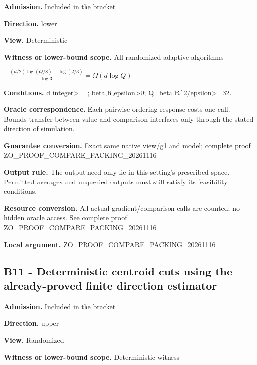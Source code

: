 \documentclass[10pt,a4paper]{article}
\newcommand{\AtlasMath}[1]{\par\begingroup\centering\setbox0=\hbox{$\displaystyle #1$}\ifdim\wd0>1.4\linewidth\typeout{ATLAS WIDE FORMULA: \the\wd0}\fi\ifdim\wd0>\linewidth\resizebox{\linewidth}{!}{\box0}\else\box0\fi\par\endgroup}
\begin{document}
\textbf{Admission.} Included in the bracket



\textbf{Direction.} lower



\textbf{View.} Deterministic



\textbf{Witness or lower-bound scope.} All randomized adaptive algorithms



\AtlasMath{\frac{(d/2)\log(Q/8)+\log(2/3)}{\log 3}=\Omega(d\log Q)}


\textbf{Conditions.} d integer>=1; beta,R,epsilon>0; Q=beta R\textasciicircum{}2/epsilon>=32.



\textbf{Oracle correspondence.} Each pairwise ordering response costs one call. Bounds transfer between value and comparison interfaces only through the stated direction of simulation.



\textbf{Guarantee conversion.} Exact same native view/g1 and model; complete proof ZO\_PROOF\_COMPARE\_PACKING\_20261116



\textbf{Output rule.} The output need only lie in this setting's prescribed space. Permitted averages and unqueried outputs must still satisfy its feasibility conditions.



\textbf{Resource conversion.} All actual gradient/comparison calls are counted; no hidden oracle access. See complete proof ZO\_PROOF\_COMPARE\_PACKING\_20261116



\textbf{Local argument.} ZO\_PROOF\_COMPARE\_PACKING\_20261116



\subsection{B11 - Deterministic centroid cuts using the already-proved finite direction estimator}


\textbf{Admission.} Included in the bracket



\textbf{Direction.} upper



\textbf{View.} Randomized



\textbf{Witness or lower-bound scope.} Deterministic witness
\end{document}
